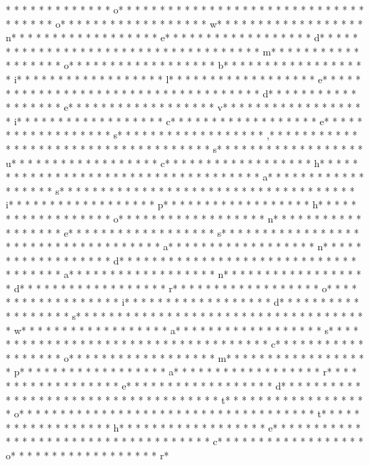 *  * * *  *  * * *  *  * * *  * o* * *  * * *  * * *  *  * * *  *  * * *  *  * * *  * * *  * * *  *  * * *  *  * * *  * o* * *  * * *  * * *  *  * * *  *  * * *  * w* * *  * * *  * * *  *  * * *  *  * * *  * n* * *  * * *  * * *  *  * * *  *  * * *  * e* * *  * * *  * * *  *  * * *  *  * * *  * d* * *  * * *  * * *  *  * * *  *  * * *  *  * * *  * * *  * * *  *  * * *  *  * * *  * m* * *  * * *  * * *  *  * * *  *  * * *  * o* * *  * * *  * * *  *  * * *  *  * * *  * b* * *  * * *  * * *  *  * * *  *  * * *  * i* * *  * * *  * * *  *  * * *  *  * * *  * l* * *  * * *  * * *  *  * * *  *  * * *  * e* * *  * * *  * * *  *  * * *  *  * * *  *  * * *  * * *  * * *  *  * * *  *  * * *  * d* * *  * * *  * * *  *  * * *  *  * * *  * e* * *  * * *  * * *  *  * * *  *  * * *  * v* * *  * * *  * * *  *  * * *  *  * * *  * i* * *  * * *  * * *  *  * * *  *  * * *  * c* * *  * * *  * * *  *  * * *  *  * * *  * e* * *  * * *  * * *  *  * * *  *  * * *  * s* * *  * * *  * * *  *  * * *  *  * * *  * ,* * *  * * *  * * *  *  * * *  *  * * *  *  * * *  * * *  * * *  *  * * *  *  * * *  * s* * *  * * *  * * *  *  * * *  *  * * *  * u* * *  * * *  * * *  *  * * *  *  * * *  * c* * *  * * *  * * *  *  * * *  *  * * *  * h* * *  * * *  * * *  *  * * *  *  * * *  *  * * *  * * *  * * *  *  * * *  *  * * *  * a* * *  * * *  * * *  *  * * *  *  * * *  * s* * *  * * *  * * *  *  * * *  *  * * *  *  * * *  * * *  * * *  *  * * *  *  * * *  * i* * *  * * *  * * *  *  * * *  *  * * *  * p* * *  * * *  * * *  *  * * *  *  * * *  * h* * *  * * *  * * *  *  * * *  *  * * *  * o* * *  * * *  * * *  *  * * *  *  * * *  * n* * *  * * *  * * *  *  * * *  *  * * *  * e* * *  * * *  * * *  *  * * *  *  * * *  * s* * *  * * *  * * *  *  * * *  *  * * *  *  * * *  * * *  * * *  *  * * *  *  * * *  * a* * *  * * *  * * *  *  * * *  *  * * *  * n* * *  * * *  * * *  *  * * *  *  * * *  * d* * *  * * *  * * *  *  * * *  *  * * *  *  * * *  * * *  * * *  *  * * *  *  * * *  * a* * *  * * *  * * *  *  * * *  *  * * *  * n* * *  * * *  * * *  *  * * *  *  * * *  * d* * *  * * *  * * *  *  * * *  *  * * *  * r* * *  * * *  * * *  *  * * *  *  * * *  * o* * *  * * *  * * *  *  * * *  *  * * *  * i* * *  * * *  * * *  *  * * *  *  * * *  * d* * *  * * *  * * *  *  * * *  *  * * *  * s* * *  * * *  * * *  *  * * *  *  * * *  *  * * *  * * *  * * *  *  * * *  *  * * *  * w* * *  * * *  * * *  *  * * *  *  * * *  * a* * *  * * *  * * *  *  * * *  *  * * *  * s* * *  * * *  * * *  *  * * *  *  * * *  *  * * *  * * *  * * *  *  * * *  *  * * *  * c* * *  * * *  * * *  *  * * *  *  * * *  * o* * *  * * *  * * *  *  * * *  *  * * *  * m* * *  * * *  * * *  *  * * *  *  * * *  * p* * *  * * *  * * *  *  * * *  *  * * *  * a* * *  * * *  * * *  *  * * *  *  * * *  * r* * *  * * *  * * *  *  * * *  *  * * *  * e* * *  * * *  * * *  *  * * *  *  * * *  * d* * *  * * *  * * *  *  * * *  *  * * *  *  * * *  * * *  * * *  *  * * *  *  * * *  * t* * *  * * *  * * *  *  * * *  *  * * *  * o* * *  * * *  * * *  *  * * *  *  * * *  *  * * *  * * *  * * *  *  * * *  *  * * *  * t* * *  * * *  * * *  *  * * *  *  * * *  * h* * *  * * *  * * *  *  * * *  *  * * *  * e* * *  * * *  * * *  *  * * *  *  * * *  *  * * *  * * *  * * *  *  * * *  *  * * *  * c* * *  * * *  * * *  *  * * *  *  * * *  * o* * *  * * *  * * *  *  * * *  *  * * *  * r* 